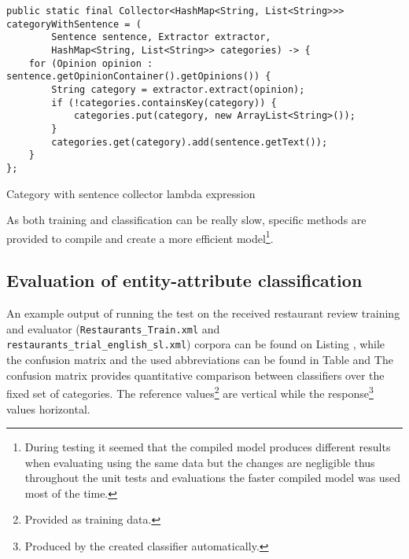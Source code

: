\begin{listing}
\begin{verbatim}
public static final Collector<HashMap<String, List<String>>> categoryWithSentence = (
        Sentence sentence, Extractor extractor,
        HashMap<String, List<String>> categories) -> {
    for (Opinion opinion : sentence.getOpinionContainer().getOpinions()) {
        String category = extractor.extract(opinion);
        if (!categories.containsKey(category)) {
            categories.put(category, new ArrayList<String>());
        }
        categories.get(category).add(sentence.getText());
    }
};
\end{verbatim}
\caption{Category with sentence collector lambda expression}
\label{listing:sentenceCollector}
\end{listing}

As both training and classification can be really slow, specific methods are
provided to compile and create a more efficient model\footnote{During
testing it seemed that the compiled model produces different results when
evaluating using the same data but the changes are negligible thus throughout
the unit tests and evaluations the faster compiled model was used most
of the time.}.

\subsection*{Evaluation of entity-attribute classification}
An example output of running the test on the received restaurant review
training and evaluator (\texttt{Restaurants\_Train.xml} and
\texttt{restaurants\_trial\_english\_sl.xml}) corpora can be found on Listing
, while the confusion matrix and the used
abbreviations can be found in Table  and
 The confusion matrix provides quantitative comparison
between classifiers over the fixed set of categories. The reference
values\footnote{Provided as training data.} are vertical while the
response\footnote{Produced by the created classifier automatically.} values
horizontal.

